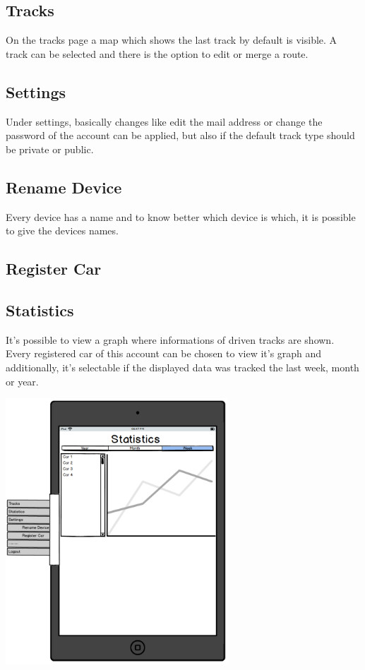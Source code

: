 \subsection{Tracks}
On the tracks page a map which shows the last track by default is visible. A track can be selected and there is the option to edit or merge a route.
\subsection{Settings}
Under settings, basically changes like edit the mail address or change the password of the account can be applied, but also if the default track type should be private or public.
\subsection{Rename Device}
Every device has a name and to know better which device is which, it is possible to give the devices names.
\subsection{Register Car}

\subsection{Statistics}
It’s possible to view a graph where informations of driven tracks are shown. Every registered car of this account can be chosen to view it’s graph and additionally, it’s selectable if the displayed data was tracked the last week, month or year.
\begin{center}
\includegraphics[width=0.625\textwidth]{Tablet}
\end{center}
